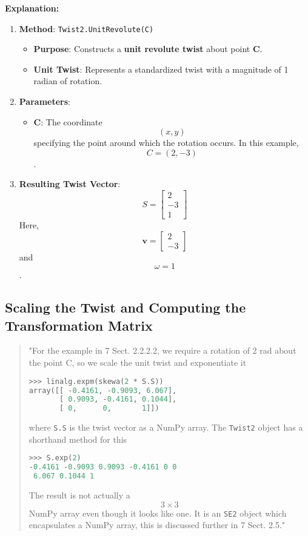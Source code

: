 \documentclass[12pt]{article}
\begin{document}
\textbf{Explanation:}

\begin{enumerate}
    \item \textbf{Method}: \texttt{Twist2.UnitRevolute(C)}
        \begin{itemize}
            \item \textbf{Purpose}: Constructs a \textbf{unit revolute twist} about point \textbf{C}.
            \item \textbf{Unit Twist}: Represents a standardized twist with a magnitude of 1 radian of rotation.
        \end{itemize}
    
    \item \textbf{Parameters}:
        \begin{itemize}
            \item \textbf{C}: The coordinate $$(x, y)$$ specifying the point around which the rotation occurs. In this example, $$ C = (2, -3) $$.
        \end{itemize}
    
    \item \textbf{Resulting Twist Vector}:
        $$
        S = 
        \begin{bmatrix}
        2 \\
        -3 \\
        1 
        \end{bmatrix}
        $$
        Here, $$ \mathbf{v} = \begin{bmatrix} 2 \\ -3 \end{bmatrix} $$ and $$ \omega = 1 $$.
\end{enumerate}

\subsection{Scaling the Twist and Computing the Transformation Matrix}

\begin{quote}
"For the example in 7 Sect. 2.2.2.2, we require a rotation of 2 rad about the point C, so we scale the unit twist and exponentiate it
\begin{lstlisting}[language=Python]
>>> linalg.expm(skewa(2 * S.S))
array([[ -0.4161, -0.9093, 6.067],
       [ 0.9093, -0.4161, 0.1044],
       [ 0,      0,       1]])
\end{lstlisting}
where \texttt{S.S} is the twist vector as a NumPy array. The \texttt{Twist2} object has a shorthand method for this
\begin{lstlisting}[language=Python]
>>> S.exp(2)
-0.4161 -0.9093 0.9093 -0.4161 0 0
 6.067 0.1044 1
\end{lstlisting}
The result is not actually a $$3 \times 3$$ NumPy array even though it looks like one. It is an \texttt{SE2} object which encapsulates a NumPy array, this is discussed further in 7 Sect. 2.5."
\end{quote}
\end{document}

